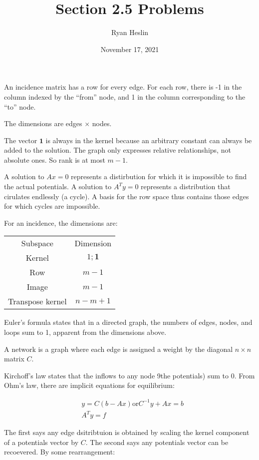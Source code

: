 \documentclass[]{article}
\title{Section 2.5 Problems}
\author{Ryan Heslin}
\date{November 17, 2021}
\begin{document}
\maketitle

An incidence matrix has a row for every edge. For each row, there is -1
in the column indexed by the ``from'' node, and 1 in the column
corresponding to the ``to'' node.

The dimensions are edges \(\times\) nodes.

The vector \(\mathbold { 1 }\) is always in the kernel because an
arbitrary constant can always be added to the solution. The graph only
expresses relative relationships, not absolute ones. So rank is at most
\(m - 1\).

A solution to \(Ax = 0\) represents a distirbution for which it is
impossible to find the actual potentials. A solution to \(A^Ty = 0\)
represents a distribution that cirulates endlessly (a cycle). A basis
for the row space thus contains those edges for which cycles are
impossible.

For an incidence, the dimensions are:

\begin{tabular}{c|c}
Subspace & Dimension \\
Kernel & $1; \mathbold { 1 }$ \\ 
Row & $m-1$\\
Image & $m-1$\\
Transpose kernel & $n - m + 1$
\end{tabular}

Euler's formula states that in a directed graph, the numbers of edges,
nodes, and loops sum to 1, apparent from the dimensions above.

A network is a graph where each edge is assigned a weight by the
diagonal \(n \times n\) matrix \(C\).

Kirchoff's law states that the inflows to any node 9the potentials) sum
to 0. From Ohm's law, there are implicit equations for equilibrium:

\[
    \begin{aligned}
    & y = C(b - Ax) \text{or} C^{-1}y + Ax = b\\ 
    & A^Ty = f
    \end{aligned}
\]

The first says any edge dsitribtuion is obtained by scaling the kernel
component of a potentials vector by \(C\). The second says any
potentials vector can be recoevered. By some rearrangement:
\end{document}
